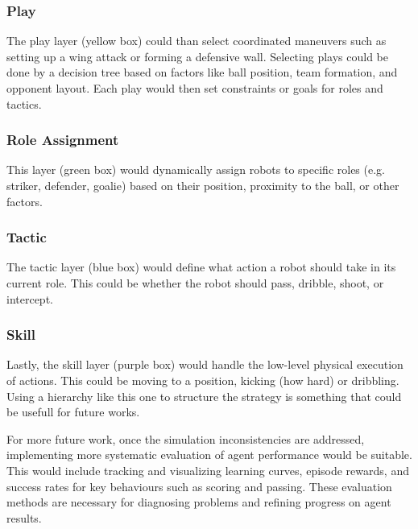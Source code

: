 \subsubsection{Play}
The play layer (yellow box) could than select coordinated maneuvers such as setting up a wing attack or forming a defensive wall. Selecting plays could be done by a decision tree based on factors like ball position, team formation, and opponent layout. Each play would then set constraints or goals for roles and tactics.

\subsubsection{Role Assignment}
This layer (green box) would dynamically assign robots to specific roles (e.g. striker, defender, goalie) based on their position, proximity to the ball, or other factors.

\subsubsection{Tactic}
The tactic layer (blue box) would define what action a robot should take in its current role.
This could be whether the robot should pass, dribble, shoot, or intercept.

\subsubsection{Skill}
Lastly, the skill layer (purple box) would handle the low-level physical execution of actions.
This could be moving to a position, kicking (how hard) or dribbling. 
\vspace{1em}
Using a hierarchy like this one to structure the strategy is something that could be usefull for future works.   


For more future work, once the simulation inconsistencies are addressed, implementing more systematic evaluation of agent performance would be suitable. This would include tracking and visualizing learning curves, episode rewards, and success rates for key behaviours such as scoring and passing. These evaluation methods are necessary for diagnosing problems and refining progress on agent results.
